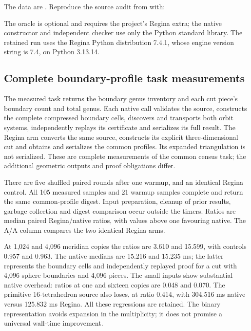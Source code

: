 The data are . Reproduce the source audit
from  with:
\begin{quote}\small
{}
\end{quote}
The oracle is optional and requires the project's Regina extra; the native
constructor and independent checker use only the Python standard library.
The retained run uses the Regina Python distribution 7.4.1, whose engine
version string is 7.4, on Python 3.13.14.

\subsection{Complete boundary-profile task measurements}

The measured task returns the boundary genus inventory and each cut piece's
boundary count and total genus. Each native call validates the source,
constructs the complete compressed boundary cells, discovers and transports
both orbit systems, independently replays its certificate and serializes
its full result. The Regina arm converts the same source, constructs its
explicit three-dimensional cut and obtains and serializes the common
profiles. Its expanded triangulation is not serialized. These are complete
measurements of the common census task; the additional geometric outputs
and proof obligations differ.

There are five shuffled paired rounds after one warmup, and an identical
Regina control. All 105 measured samples and 21 warmup samples complete and
return the same common-profile digest. Input preparation, cleanup of prior
results, garbage collection and digest comparison occur outside the timers.
Ratios are median paired Regina/native ratios, with values above one
favouring native. The A/A column compares the two identical Regina arms.


At 1,024 and 4,096 meridian copies the ratios are 3.610 and 15.599,
with controls 0.957 and 0.963. The native medians are 15.216 and 15.235 ms;
the latter represents the boundary cells and independently replayed proof
for a cut with 4,096 sphere boundaries and 4,096 pieces. The small inputs
show substantial native overhead: ratios at one and sixteen copies are
0.048 and 0.070. The primitive 16-tetrahedron source also loses, at ratio
0.414, with 304.516 ms native versus 125.832 ms Regina. All these regressions
are retained. The binary representation avoids expansion in the multiplicity;
it does not promise a universal wall-time improvement.

